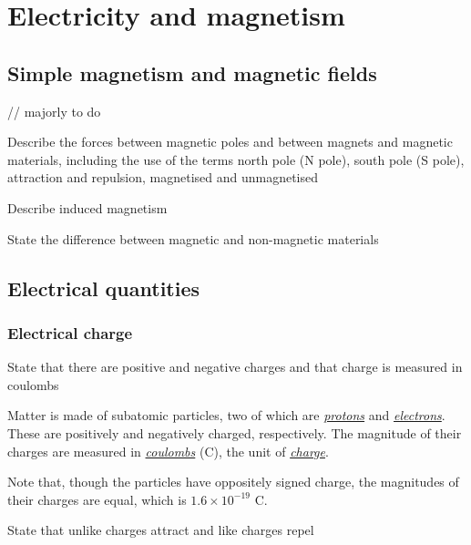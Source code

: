 \section{Electricity and magnetism}
\subsection{Simple magnetism and magnetic fields}

// majorly to do

\begin{point}
Describe the forces between magnetic poles and between magnets and magnetic materials, including 
the use of the terms north pole (N pole), south pole (S pole), attraction and repulsion, magnetised and 
unmagnetised
\end{point}

\begin{point}
	Describe induced magnetism
\end{point}

\begin{point}
	State the difference between magnetic and non-magnetic materials
\end{point}

\subsection{Electrical quantities}
\subsubsection{Electrical charge}

\begin{subpoint}
State that there are positive and negative charges and that charge is measured in coulombs
\end{subpoint}

Matter is made of subatomic particles, two of which are \ul{\emph{protons}} and \ul{\emph{electrons}}.
These are positively and negatively charged, respectively. The magnitude of their charges are
measured in \ul{\emph{coulombs}} (C), the unit of \ul{\emph{charge}}.

Note that, though the particles have oppositely signed charge, the magnitudes of their charges are
equal, which is $1.6 \times 10^{-19}$ C.

\begin{subpoint}
State that unlike charges attract and like charges repel
\end{subpoint}

